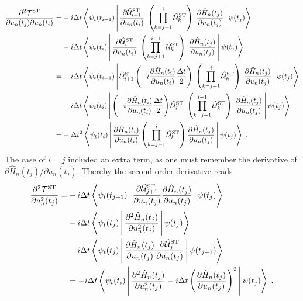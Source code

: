 \begin{align}
	\frac{\partial^2 \mathcal{T}^{\mathrm{ST}}}{\partial u_n (t_j) \partial u_n (t_i)} =& -i \Delta t \Braket{\psi_t (t_{i+1}) | \frac{\partial \hat{\mathcal{U}}_{i+1}^{\mathrm{ST}}}{\partial u_n (t_i)} \; \left( \prod_{k = j+1}^{i} \hat{\mathcal{U}}_{k}^{\mathrm{ST}} \right) \; \frac{\partial \hat{H}_n (t_j)}{\partial u_n (t_j)} | \psi (t_j) } \nonumber \\
	& -i \Delta t \Braket{\psi_t (t_{i}) | \frac{\partial \hat{\mathcal{U}}_{i}^{\mathrm{ST}}}{\partial u_n (t_i)} \; \left( \prod_{k = j+1}^{i-1} \hat{\mathcal{U}}_{k}^{\mathrm{ST}} \right) \; \frac{\partial \hat{H}_n (t_j)}{\partial u_n (t_j)} | \psi (t_j) } \nonumber \\
	=& -i \Delta t \Braket{\psi_t (t_{i+1}) |  \hat{\mathcal{U}}_{i+1}^{\mathrm{ST}} \left( -i \frac{\partial \hat{H}_n (t_i)}{\partial u_n (t_i)} \frac{\Delta t}{2} \right) \; \left( \prod_{k = j+1}^{i} \hat{\mathcal{U}}_{k}^{\mathrm{ST}} \right) \; \frac{\partial \hat{H}_n (t_j)}{\partial u_n (t_j)} | \psi (t_j) } \nonumber \\
	& -i \Delta t \Braket{\psi_t (t_{i}) | \left( -i \frac{\partial \hat{H}_n (t_i)}{\partial u_n (t_i)} \frac{\Delta t}{2} \right) \hat{\mathcal{U}}_{i}^{\mathrm{ST}} \; \left( \prod_{k = j+1}^{i-1} \hat{\mathcal{U}}_{k}^{\mathrm{ST}} \right) \; \frac{\partial \hat{H}_n (t_j)}{\partial u_n (t_j)} | \psi (t_j) } \nonumber \\
	=& - \Delta t^2 \Braket{\psi_t (t_i) | \frac{\partial \hat{H}_n (t_i)}{\partial u_n (t_i)} \left( \prod_{k = j + 1}^{i} \hat{\mathcal{U}}_{k}^{\mathrm{ST}} \right) \frac{\partial \hat{H}_n (t_j)}{\partial u_n (t_j)} | \psi (t_j) }  \; .
\end{align}
The case of $i = j$ included an extra term, as one must remember the derivative of ${\partial \hat{H}_n (t_j)}/{\partial u_n (t_j)}$. Thereby the second order derivative reads
\begin{align}
	\frac{\partial^2 \mathcal{T}^{\mathrm{ST}}}{\partial u_n ^2 (t_j)} =& -i \Delta t \Braket{\psi_t (t_{j+1}) | \frac{\partial \hat{\mathcal{U}}_{j+1}^{\mathrm{ST}}}{\partial u_n (t_j)} \frac{\partial \hat{H}_n (t_j)}{\partial u_n (t_j)} | \psi (t_j) } \nonumber \\
 & 	-i \Delta t \Braket{\psi_t (t_{j}) |  \frac{\partial ^2 \hat{H}_n (t_j)}{\partial u_n ^2(t_j)} | \psi (t_j) } \nonumber \\
 & -i \Delta t \Braket{\psi_t (t_{j}) |  \frac{\partial \hat{H}_n (t_j)}{\partial u_n (t_j)} \frac{\partial \hat{\mathcal{U}}_{j}^{\mathrm{ST}}}{\partial u_n (t_j)}| \psi (t_{j-1}) } \nonumber \\
 & = - i \Delta t \Braket{\psi_t (t_i) | \frac{\partial^2 \hat{H}_n (t_j)}{\partial u_n ^2 (t_j)} - i \Delta t \left( \frac{\partial \hat{H}_n (t_j)}{\partial u_n (t_j)} \right)^2 | \psi (t_j) } \; .
\end{align}
